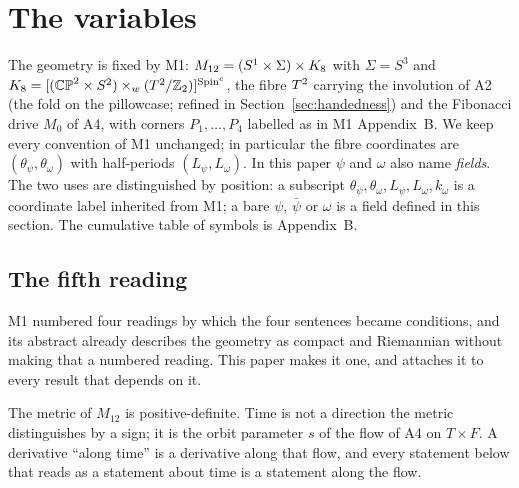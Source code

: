 
\section{The variables}\label{sec:variables}

The geometry is fixed by M1: $M_{12}=(S^{1}\times\Sigma)\times K_8$ with
$\Sigma=S^{3}$ and $K_8=[(\mathbb{CP}^2\times S^2)\times_{w}(T^2/\mathbb{Z}_2)]^{\text{Spin}^c}$,
the fibre $T^2$ carrying the involution of A2 (the fold on the pillowcase; refined in Section~\ref{sec:handedness}) and the
Fibonacci drive $M_{0}$ of A4, with corners $P_{1},\dots,P_{4}$ labelled as in
M1 Appendix~B. We keep every convention of M1 unchanged; in particular the
fibre coordinates are $(\theta_{\psi},\theta_{\omega})$ with half-periods
$(L_{\psi},L_{\omega})$. In this paper $\psi$ and $\omega$ also name
\emph{fields}. The two uses are distinguished by position: a subscript
$\theta_{\psi},\theta_{\omega},L_{\psi},L_{\omega},k_{\omega}$ is a coordinate
label inherited from M1; a bare $\psi$, $\bar\psi$ or $\omega$ is a field
defined in this section. The cumulative table of symbols is Appendix~B.

\subsection{The fifth reading}\label{sec:readings}

M1 numbered four readings by which the four sentences became conditions,
and its abstract already describes the geometry as compact and Riemannian
without making that a numbered reading. This paper makes it one, and
attaches it to every result that depends on it.

\begin{definition}\label{def:riemannian}
The metric of $M_{12}$ is positive-definite. Time is not a direction the
metric distinguishes by a sign; it is the orbit parameter $s$ of the flow of
A4 on $T\times F$. A derivative ``along time'' is a derivative along that
flow, and every statement below that reads as a statement about time is a
statement along the flow.
\end{definition}


